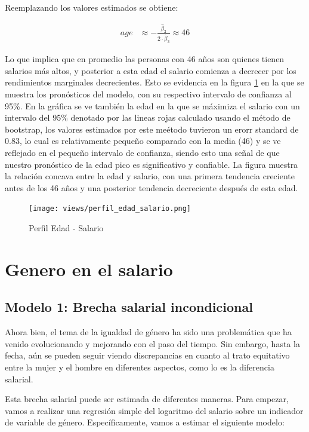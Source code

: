 \documentclass[10pt]{article}
\begin{document}
{Reemplazando los valores estimados se obtiene: }

\begin{align*}
    \tag{Peak Age}
    age &\approx -\frac{\hat{\beta}_2}{2\cdot\hat{\beta}_3} \approx 46
\end{align*}

{Lo que implica que en promedio las personas con 46 años son quienes tienen salarios m\'as altos, y posterior a esta edad el salario comienza a decrecer por los rendimientos marginales decrecientes. Esto se evidencia en la figura \ref{fig:perfilsalario} en la que se muestra los pron\'osticos del modelo, con su respectivo intervalo de confianza al 95\%. En la gr\'afica se ve tambi\'en la edad en la que se m\'aximiza el salario con un intervalo del 95\% denotado por las lineas rojas calculado usando el m\'etodo de bootstrap, los valores estimados por este me\'etodo tuvieron un erorr standard de 0.83, lo cual es relativamente pequeño comparado con la media (46) y se ve reflejado en el pequeño intervalo de confianza, siendo esto una señal de que nuestro pron\'ostico de la edad pico es significativo y confiable. La figura muestra la relaci\'on concava entre la edad y salario, con una primera tendencia creciente antes de los 46 años y una posterior tendencia decreciente despu\'es de esta edad.}

\begin{figure}[H]
    \centering
    \texttt{[image: views/perfil\_edad\_salario.png]}\
    \caption{Perfil Edad - Salario}
    \label{fig:perfilsalario}
\end{figure}

\section{Genero en el salario}

\subsection{Modelo 1: Brecha salarial incondicional}

Ahora bien, el tema de la igualdad de género ha sido una problemática que ha venido evolucionando y mejorando con el paso del tiempo. Sin embargo, hasta la fecha, aún se pueden seguir viendo discrepancias en cuanto al trato equitativo entre la mujer y el hombre en diferentes aspectos, como lo es la diferencia salarial. 

Esta brecha salarial puede ser estimada de diferentes maneras. Para empezar, vamos a realizar una regresión simple del logaritmo del salario sobre un indicador de variable de género. Específicamente, vamos a estimar el siguiente modelo: 
\end{document}
